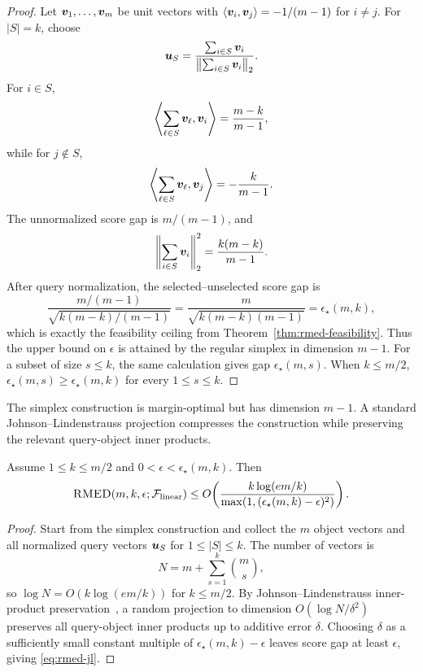 \documentclass{article}
\begin{document}
\begin{proof}
Let $\bm{v}_1,\dots,\bm{v}_m$ be unit vectors with $\langle \bm{v}_i,\bm{v}_j\rangle=-1/(m-1)$ for $i\ne j$. For $|S|=k$, choose
\[
    \bm{u}_S=\frac{\sum_{i\in S}\bm{v}_i}{\left\|\sum_{i\in S}\bm{v}_i\right\|_2}.
\]
For $i\in S$,
\[
    \left\langle \sum_{\ell\in S}\bm{v}_\ell,\bm{v}_i\right\rangle
    =
    \frac{m-k}{m-1},
\]
while for $j\notin S$,
\[
    \left\langle \sum_{\ell\in S}\bm{v}_\ell,\bm{v}_j\right\rangle
    =
    -\frac{k}{m-1}.
\]
The unnormalized score gap is $m/(m-1)$, and
\[
    \left\|\sum_{i\in S}\bm{v}_i\right\|_2^2
    =
    \frac{k(m-k)}{m-1}.
\]
After query normalization, the selected--unselected score gap is
\[
    \frac{m/(m-1)}{\sqrt{k(m-k)/(m-1)}}
    =
    \frac{m}{\sqrt{k(m-k)(m-1)}}
    =
    \epsilon_\star(m,k),
\]
which is exactly the feasibility ceiling from Theorem~\ref{thm:rmed-feasibility}. Thus the upper bound on $\epsilon$ is attained by the regular simplex in dimension $m-1$. For a subset of size $s\leq k$, the same calculation gives gap $\epsilon_\star(m,s)$. When $k\leq m/2$, $\epsilon_\star(m,s)\geq \epsilon_\star(m,k)$ for every $1\leq s\leq k$.
\end{proof}

The simplex construction is margin-optimal but has dimension $m-1$. A standard Johnson--Lindenstrauss projection compresses the construction while preserving the relevant query-object inner products.

\begin{theorem}\label{thm:rmed-jl}
Assume $1\leq k\leq m/2$ and $0<\epsilon<\epsilon_\star(m,k)$. Then
\begin{align}
    \textsc{RMED}(m,k,\epsilon;\mathcal{F}_{\rm linear})
    \leq
    O\!\left(
    \frac{k\log(em/k)}
    {\max(1, (\epsilon_\star(m,k)-\epsilon)^2)}
    \right).
    \label{eq:rmed-jl}
\end{align}
\end{theorem}

\begin{proof}
Start from the simplex construction and collect the $m$ object vectors and all normalized query vectors $\bm{u}_S$ for $1\leq |S|\leq k$. The number of vectors is
\[
    N=m+\sum_{s=1}^k \binom{m}{s},
\]
so $\log N=O(k\log(em/k))$ for $k\leq m/2$. By Johnson--Lindenstrauss inner-product preservation~\citep{vershynin2018high}, a random projection to dimension $O(\log N/\delta^2)$ preserves all query-object inner products up to additive error $\delta$. Choosing $\delta$ as a sufficiently small constant multiple of $\epsilon_\star(m,k)-\epsilon$ leaves score gap at least $\epsilon$, giving \eqref{eq:rmed-jl}.
\end{proof}
\end{document}
